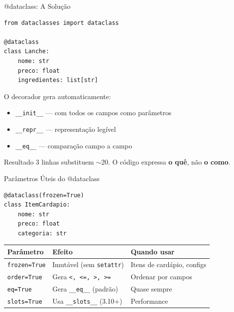 \documentclass[aspectratio=169]{beamer}
\begin{document}
\begin{frame}[fragile,shrink=3]{@dataclass: A Solução}
\begin{lstlisting}
from dataclasses import dataclass

@dataclass
class Lanche:
    nome: str
    preco: float
    ingredientes: list[str]
\end{lstlisting}

O decorador gera automaticamente:
\begin{itemize}
  \item \texttt{\_\_init\_\_} --- com todos os campos como parâmetros
  \item \texttt{\_\_repr\_\_} --- representação legível
  \item \texttt{\_\_eq\_\_} --- comparação campo a campo
\end{itemize}

\begin{exampleblock}{Resultado}
3 linhas substituem $\sim$20. O código expressa \textbf{o quê}, não \textbf{o como}.
\end{exampleblock}
\end{frame}

\begin{frame}[fragile]{Parâmetros Úteis do @dataclass}
\begin{lstlisting}
@dataclass(frozen=True)
class ItemCardapio:
    nome: str
    preco: float
    categoria: str
\end{lstlisting}

\begin{table}
\centering
\begin{tabular}{lll}
\toprule
\textbf{Parâmetro} & \textbf{Efeito} & \textbf{Quando usar} \\
\midrule
\texttt{frozen=True}  & Imutável (sem \texttt{setattr}) & Itens de cardápio, configs \\
\texttt{order=True}   & Gera \texttt{<, <=, >, >=}     & Ordenar por campos \\
\texttt{eq=True}       & Gera \texttt{\_\_eq\_\_} (padrão) & Quase sempre \\
\texttt{slots=True}   & Usa \texttt{\_\_slots\_\_} (3.10+) & Performance \\
\bottomrule
\end{tabular}
\end{table}
\end{frame}
\end{document}
